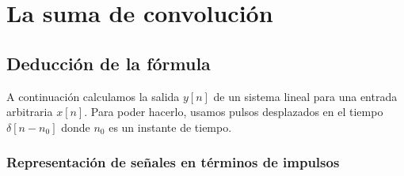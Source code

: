 \chapter{La suma de convolución}

\section{Deducción de la fórmula}

A continuación calculamos la salida $y[n]$ de un sistema lineal para una entrada arbitraria $x[n]$. Para poder hacerlo, usamos pulsos desplazados en el tiempo $\delta[n-n_{0}]$ donde $n_{0}$ es un instante de tiempo.

\subsection{Representación de señales en términos de impulsos}

